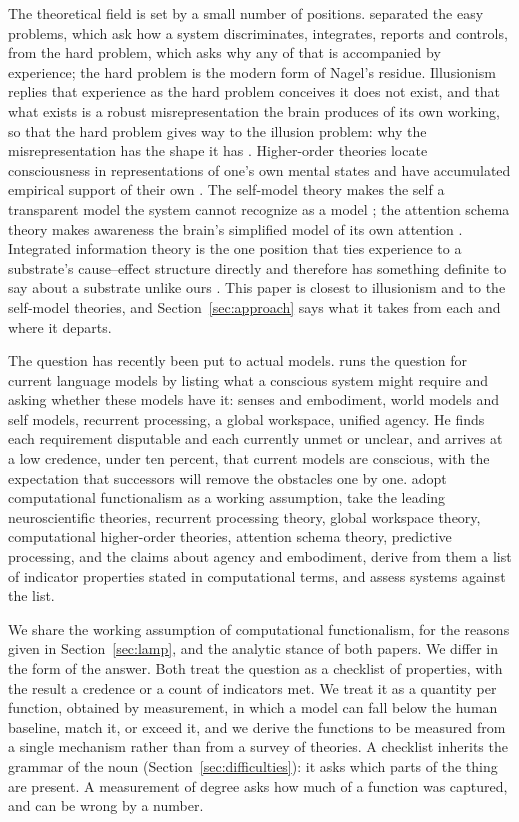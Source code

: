 The theoretical field is set by a small number of positions. \citet{chalmers1995} separated the easy
problems, which ask how a system discriminates, integrates, reports and controls, from the hard
problem, which asks why any of that is accompanied by experience; the hard problem is the modern form
of Nagel's residue. Illusionism replies that experience as the hard problem conceives it does not
exist, and that what exists is a robust misrepresentation the brain produces of its own working, so
that the hard problem gives way to the illusion problem: why the misrepresentation has the shape it
has \citep{dennett1991,frankish2016}. Higher-order theories locate consciousness in representations of
one's own mental states and have accumulated empirical support of their own
\citep{rosenthal2005,lau2011}. The self-model theory makes the self a transparent model the system
cannot recognize as a model \citep{metzinger2003}; the attention schema theory makes awareness the
brain's simplified model of its own attention \citep{graziano2011,graziano2013}. Integrated information
theory is the one position that ties experience to a substrate's cause--effect structure directly and
therefore has something definite to say about a substrate unlike ours \citep{tononi2015}. This paper
is closest to illusionism and to the self-model theories, and Section~\ref{sec:approach} says what it
takes from each and where it departs.

The question has recently been put to actual models. \citet{chalmers2023} runs the question for current language models by
listing what a conscious system might require and asking whether these models have it: senses and
embodiment, world models and self models, recurrent processing, a global workspace, unified agency.
He finds each requirement disputable and each currently unmet or unclear, and arrives at a low
credence, under ten percent, that current models are conscious, with the expectation that successors
will remove the obstacles one by one. \citet{butlin2023} adopt computational functionalism as a
working assumption, take the leading neuroscientific theories, recurrent processing theory, global
workspace theory, computational higher-order theories, attention schema theory, predictive processing,
and the claims about agency and embodiment, derive from them a list of indicator properties stated in
computational terms, and assess systems against the list.

We share the working assumption of computational functionalism, for the reasons given in
Section~\ref{sec:lamp}, and the analytic stance of both papers. We differ in the form of the answer.
Both treat the question as a checklist of properties, with the result a credence or a count of
indicators met. We treat it as a quantity per function, obtained by measurement, in which a model can
fall below the human baseline, match it, or exceed it, and we derive the functions to be measured from
a single mechanism rather than from a survey of theories. A checklist inherits the grammar of the noun
(Section~\ref{sec:difficulties}): it asks which parts of the thing are present. A measurement of degree
asks how much of a function was captured, and can be wrong by a number.


